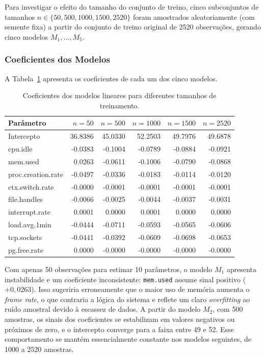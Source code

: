 \documentclass[11pt,a4paper]{article}
\begin{document}
Para investigar o efeito do tamanho do conjunto de treino, cinco subconjuntos de tamanhos $n \in \{50, 500, 1000, 1500, 2520\}$ foram amostrados aleatoriamente (com semente fixa) a partir do conjunto de treino original de 2520 observações, gerando cinco modelos $M_1, \ldots, M_5$.

\subsubsection{Coeficientes dos Modelos}

A Tabela~\ref{tab:coefs_sizes} apresenta os coeficientes de cada um dos cinco modelos.

\begin{table}[H]
\centering
\caption{Coeficientes dos modelos lineares para diferentes tamanhos de treinamento.}
\label{tab:coefs_sizes}
\small
\begin{tabular}{lrrrrr}
\toprule
\textbf{Parâmetro} & \textbf{$n=50$} & \textbf{$n=500$} & \textbf{$n=1000$} & \textbf{$n=1500$} & \textbf{$n=2520$} \\
\midrule
Intercepto              & 36.8386 & 45.0330 & 52.2503 & 49.7976 & 49.6878 \\
cpu.idle                & -0.0383 & -0.1004 & -0.0789 & -0.0884 & -0.0921 \\
mem.used                &  0.0263 & -0.0611 & -0.1006 & -0.0790 & -0.0868 \\
proc.creation.rate      & -0.0497 & -0.0336 & -0.0183 & -0.0114 & -0.0120 \\
ctx.switch.rate         & -0.0000 & -0.0001 & -0.0001 & -0.0001 & -0.0001 \\
file.handles            & -0.0066 & -0.0025 & -0.0044 & -0.0037 & -0.0031 \\
interrupt.rate          &  0.0001 &  0.0000 &  0.0001 &  0.0000 &  0.0000 \\
load.avg.1min           & -0.0444 & -0.0711 & -0.0593 & -0.0565 & -0.0606 \\
tcp.sockets             & -0.0441 & -0.0392 & -0.0609 & -0.0698 & -0.0653 \\
pg.free.rate            &  0.0000 & -0.0000 & -0.0000 & -0.0000 & -0.0000 \\
\bottomrule
\end{tabular}
\end{table}

Com apenas 50 observações para estimar 10 parâmetros, o modelo $M_1$ apresenta instabilidade e um coeficiente inconsistente: \texttt{mem.used} assume sinal positivo ($+0{,}0263$). Isso sugeriria erroneamente que o maior uso de memória aumenta o \emph{frame rate}, o que contraria a lógica do sistema e reflete um claro \emph{overfitting} ao ruído amostral devido à escassez de dados. A partir do modelo $M_2$, com 500 amostras, os sinais dos coeficientes se estabilizam em valores negativos ou próximos de zero, e o intercepto converge para a faixa entre 49 e 52. Esse comportamento se mantém essencialmente constante nos modelos seguintes, de 1000 a 2520 amostras.
\end{document}
